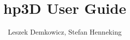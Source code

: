 \documentclass[11pt]{report}
\begin{document}
\baselineskip=16pt
\parskip=4pt

\begin{titlepage}
\title
{
hp3D User Guide
}
\author
{
\Large
Leszek Demkowicz, Stefan Henneking
}
\maketitle

\end{titlepage}

\tableofcontents


\graphicspath{{Figures/1_INTRODUCTION/}}


\graphicspath{{Figures/2_INSTALLING/}}



% 

% 



\end{document}
